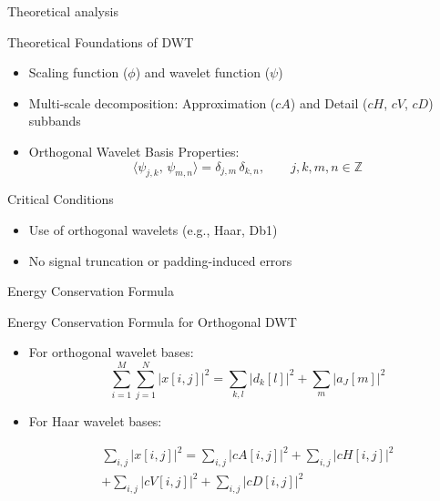 \documentclass{beamer}
\begin{document}
\begin{frame}{Theoretical analysis}
    \begin{block}{Theoretical Foundations of DWT}
        \begin{itemize}
            \item Scaling function ($\phi$) and wavelet function ($\psi$)
            \item Multi-scale decomposition: Approximation ($cA$) and Detail   ($cH$, $cV$, $cD$) subbands
            \item Orthogonal Wavelet Basis Properties:
                  \[
                      \langle \psi_{j,k},\,\psi_{m,n}\rangle
                      = \delta_{j,m}\,\delta_{k,n},
                      \qquad j,k,m,n\in\mathbb{Z}
                  \]


        \end{itemize}
    \end{block}





    \begin{block}{Critical Conditions}
        \begin{itemize}
            \item Use of orthogonal wavelets (e.g., Haar, Db1)
            \item No signal truncation or padding-induced errors
        \end{itemize}
    \end{block}
\end{frame}
\begin{frame}{ Energy Conservation Formula }
    \begin{block}{Energy Conservation Formula for Orthogonal DWT}
        \begin{itemize}
            \item For orthogonal wavelet bases:
                  \[
                      \sum_{i=1}^{M} \sum_{j=1}^{N} |x[i,j]|^2 = \sum_{k,l} |d_k[l]|^2 + \sum_{m} |a_J[m]|^2
                  \]
            \item For Haar wavelet bases:

                  \[
                      \begin{aligned}
                          \sum_{i,j} |x[i,j]|^2 =\sum_{i,j} |cA[i,j]|^2 + \sum_{i,j} |cH[i,j]|^2 \\+ \sum_{i,j} |cV[i,j]|^2 +\sum_{i,j} |cD[i,j]|^2
                      \end{aligned}
                  \]
        \end{itemize}
    \end{block}



\end{frame}
\end{document}
